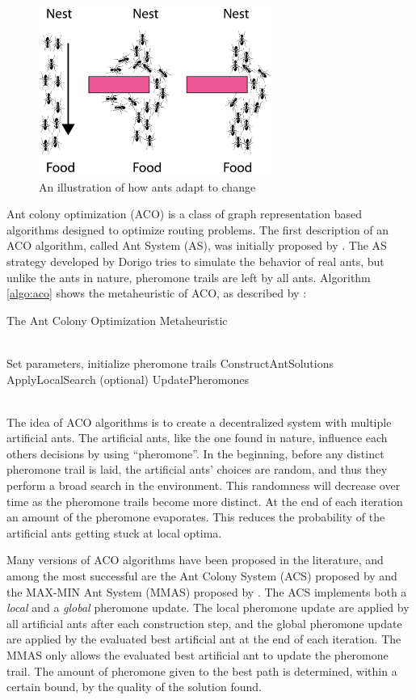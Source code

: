 \begin{figure}[H]
  \centering
  \includegraphics[width=3in]{assets/maur.png}
  \caption{An illustration of how ants adapt to change} 
   \label{fig:ants}
\end{figure}

Ant colony optimization (ACO) is a class of graph representation based algorithms designed to optimize routing problems. The first description of an ACO algorithm, called Ant System (AS), was initially proposed by \citet{dorigo96}. The AS strategy developed by Dorigo tries to simulate the behavior of real ants, but unlike the ants in nature, pheromone trails are left by all ants. Algorithm \ref{algo:aco} shows the metaheuristic of ACO, as described by \citet{dorigo06}:
\begin{algorithm}[H]
\caption{The Ant Colony Optimization Metaheuristic}
\label{algo:aco}
\begin{algorithmic}
\\ Set parameters, initialize pheromone trails
    \State ConstructAntSolutions
    \State ApplyLocalSearch (optional)
    \State UpdatePheromones
  \EndWhile
\end{algorithmic}
\end{algorithm}
~\\

The idea of ACO algorithms is to create a decentralized system with multiple artificial ants. The artificial ants, like the one found in nature, influence each others decisions by using ``pheromone''. In the beginning, before any distinct pheromone trail is laid, the artificial ants' choices are random, and thus they perform a broad search in the environment. This randomness will decrease over time as the pheromone trails become more distinct. At the end of each iteration an amount of the pheromone evaporates. This reduces the probability of the artificial ants getting stuck at local optima. 

Many versions of ACO algorithms have been proposed in the literature, and among the most successful are the Ant Colony System (ACS) proposed by \citet{dorigo97} and the MAX-MIN Ant System (MMAS) proposed by \citet{stutzle06}. The ACS implements both a \textit{local} and a \textit{global} pheromone update. The local pheromone update are applied by all artificial ants after each construction step, and the global pheromone update are applied by the evaluated best artificial ant at the end of each iteration. The MMAS only allows the evaluated best artificial ant to update the pheromone trail. The amount of pheromone given to the best path is determined, within a certain bound, by the quality of the solution found. 

